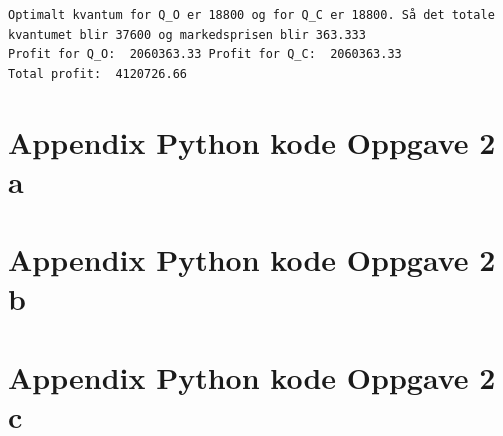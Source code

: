 \documentclass[
  12pt,
  a4paper,
  DIV=11,
  numbers=noendperiod]{scrartcl}
\begin{document}
\begin{verbatim}
Optimalt kvantum for Q_O er 18800 og for Q_C er 18800. Så det totale kvantumet blir 37600 og markedsprisen blir 363.333
Profit for Q_O:  2060363.33 Profit for Q_C:  2060363.33 
Total profit:  4120726.66
\end{verbatim}

\clearpage

\section {Appendix Python kode Oppgave 2 a}

\clearpage

\section {Appendix Python kode Oppgave 2 b}

\clearpage

\section {Appendix Python kode Oppgave 2 c}
\end{document}
